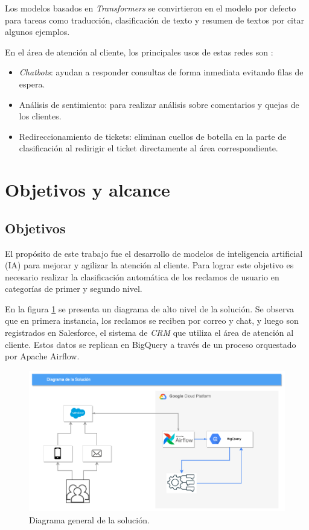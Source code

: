 
Los modelos basados en \textit{Transformers} se convirtieron en el modelo por defecto para tareas como traducción, clasificación de texto y resumen de textos por citar algunos ejemplos.

En el área de atención al cliente, los principales usos de estas redes son \citep{WEBSITE:14}:
\begin{itemize}
\item \textit{Chatbots}: ayudan a responder consultas de forma inmediata evitando filas de espera.
\item Análisis de sentimiento: para realizar análisis sobre comentarios y quejas de los clientes.
\item Redireccionamiento de tickets: eliminan cuellos de botella en la parte de clasificación al redirigir el ticket directamente al área correspondiente.
\end{itemize}


\section{Objetivos y alcance}

\subsection{Objetivos}

El propósito de este trabajo fue el desarrollo de modelos de inteligencia artificial (IA) para mejorar y agilizar la atención al cliente. Para lograr este objetivo es necesario realizar la clasificación automática de los reclamos de usuario en categorías de primer y segundo nivel.

En la figura \ref{fig:diag1} se presenta un diagrama de alto nivel de la solución. Se observa que en primera instancia, los reclamos se reciben por correo y chat, y luego son registrados en Salesforce, el sistema de \textit{CRM} que utiliza el área de atención al cliente. Estos datos se replican en BigQuery a través de un proceso orquestado por Apache Airflow.

\begin{figure}[htbp]
	\centering
	\includegraphics[width=.8\textwidth]{./Figures/solucion1.png}
	\caption{Diagrama general de la solución.}
	\label{fig:diag1}
\end{figure}

